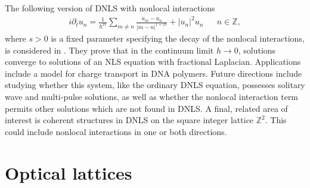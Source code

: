 \documentclass[12pt,reqno,oneside]{article}
\begin{document}
The following version of DNLS with nonlocal interactions
\begin{align*}
    i \partial_t u_n = \frac{1}{h^{2s}} \sum_{m \neq n} \frac{u_m - u_n}{|m - n|^{1+2s}} + |u_n|^2 u_n && n \in \mathbb{Z},
\end{align*}
where $s > 0$ is a fixed parameter specifying the decay of the nonlocal interactions, is considered in \cite{Kirkpatrick2013}. They prove that in the continuum limit $h\rightarrow 0$, solutions converge to solutions of an NLS equation with fractional Laplacian. Applications include a model for charge transport in DNA polymers. Future directions include studying whether this system, like the ordinary DNLS equation, possesses solitary wave and multi-pulse solutions, as well as whether the nonlocal interaction term permits other solutions which are not found in DNLS. A final, related area of interest is coherent structures in DNLS on the square integer lattice $\mathbb{Z}^2$. This could include nonlocal interactions in one or both directions.

\section*{Optical lattices}
\end{document}
